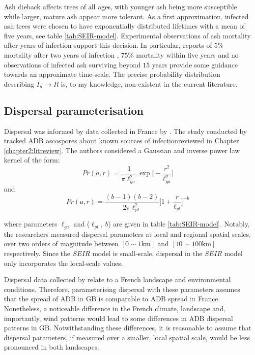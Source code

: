 Ash dieback affects trees of all ages, with younger ash being more susceptible while larger, mature ash appear more tolerant. 
As a first approximation, infected ash trees were chosen to have exponentially distributed lifetimes with a mean of five years, see table \ref{tab:SEIR-model}.
Experimental observations of ash mortality after years of infection support this decision. 
In particular, reports of $5\%$ mortality after two years of infection \cite{kessler2012dieback}, $75\%$ mortality within five years \cite{langer2015ash}  %
and no observations of infected ash surviving beyond $15$ years \cite{wylder2018evidence} provide some guidance towards an approximate time-scale.
The precise probability distribution describing $I_{n}\rightarrow R$ is, to my knowledge, non-existent in the current literature.

\subsection{Dispersal parameterisation}

Dispersal was informed by data collected in France by \cite{grosdidier2018tracking}.
The study conducted by \cite{grosdidier2018tracking} tracked ADB ascospores about known sources of infection\textemdash reviewed in Chapter \ref{chapter2:litreview}.
The authors considered a Gaussian and inverse power law kernel of the form:
\begin{equation}
    Pr(a, r) = \frac{1}{\pi \ell_{ga}^2} \exp\big[-\frac{r^2}{\ell_{ga}^2}\big]
\end{equation}
and
\begin{equation}
    Pr(a, r) = \frac{(b-1)(b-2)}{2\pi \ell_{pl}^2} \big[ 1+ \frac{r}{\ell_{pl}}\big]^{-b}
\end{equation}

where parameters $\ell_{ga}$ and ($\ell_{pl},\ b$) are given in table \ref{tab:SEIR-model}.
Notably, the researchers measured dispersal parameters at local and regional spatial scales, over two orders of magnitude between $[0 \sim 1\mathrm{km}]$ and $[10 \sim 100 \mathrm{km}]$ respectively.
Since the $SEIR$ model is small-scale, dispersal in the $SEIR$ model only incorporates the local-scale values.

Dispersal data collected by \cite{grosdidier2018tracking} relate to a French landscape and environmental conditions.
Therefore, parameterising dispersal with these parameters assumes that the spread of ADB in GB is comparable to ADB spread in France. 
Nonetheless, a noticeable difference in the French climate, landscape and, importantly, wind patterns would lead to some differences in ADB dispersal patterns in GB.
Notwithstanding these differences, it is reasonable to assume that dispersal parameters, if measured over a smaller, local spatial scale, would be less pronounced in both landscapes. 

